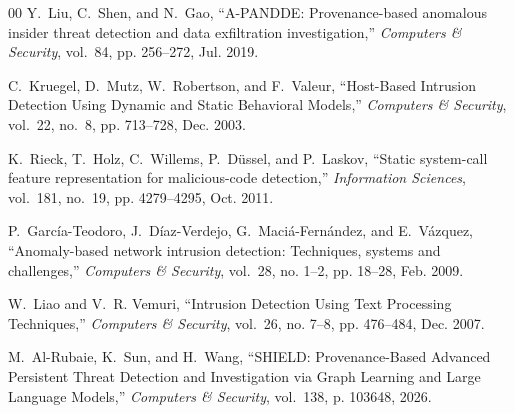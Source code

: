 \documentclass[conference]{IEEEtran}
\begin{document}
\begin{thebibliography}{00}
Y.~Liu, C.~Shen, and N.~Gao, ``A-PANDDE: Provenance-based anomalous insider threat detection and data exfiltration investigation,'' \emph{Computers \& Security}, vol.~84, pp. 256--272, Jul. 2019.

C.~Kruegel, D.~Mutz, W.~Robertson, and F.~Valeur, ``Host-Based Intrusion Detection Using Dynamic and Static Behavioral Models,'' \emph{Computers \& Security}, vol.~22, no.~8, pp. 713--728, Dec. 2003.

K.~Rieck, T.~Holz, C.~Willems, P.~D{\"{u}}ssel, and P.~Laskov, ``Static system-call feature representation for malicious-code detection,'' \emph{Information Sciences}, vol.~181, no.~19, pp. 4279--4295, Oct. 2011.

P.~Garc{\'{i}}a-Teodoro, J.~D{\'{i}}az-Verdejo, G.~Maci{\'{a}}-Fern{\'{a}}ndez, and E.~V{\'{a}}zquez, ``Anomaly-based network intrusion detection: Techniques, systems and challenges,'' \emph{Computers \& Security}, vol.~28, no. 1--2, pp. 18--28, Feb. 2009.

W.~Liao and V.~R. Vemuri, ``Intrusion Detection Using Text Processing Techniques,'' \emph{Computers \& Security}, vol.~26, no. 7--8, pp. 476--484, Dec. 2007.

M.~Al-Rubaie, K.~Sun, and H.~Wang, ``SHIELD: Provenance-Based Advanced Persistent Threat Detection and Investigation via Graph Learning and Large Language Models,'' \emph{Computers \& Security}, vol.~138, p. 103648, 2026.

\end{thebibliography}
\end{document}
